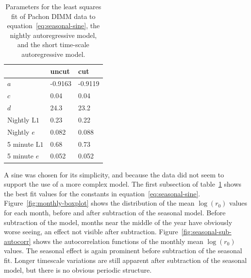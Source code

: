 \documentclass[DM,authoryear,toc]{lsstdoc}
\begin{document}
\begin{table}
\begin{center}
  \begin{tabular}{ l l l } \hline
      & uncut & cut \\ \hline
  $a$ & -0.9163 & -0.9119\\
  $c$ & 0.04 & 0.04 \\
  $d$ & 24.3 &  23.2 \\ \hline
  Nightly $\mbox{L1}$ & 0.23 & 0.22 \\
  Nightly $e$ & 0.082 & 0.088\\ \hline
  5 minute $\mbox{L1}$ & 0.68 & 0.73\\
  5 minute $e$ & 0.052 & 0.052\\ \hline
\end{tabular}
\caption{Parameters for the least squares fit of Pachon DIMM data to
  equation~\ref{eq:seasonal-sine}, the nightly autoregressive model,
  and the short time-scale autoregressive model.}\label{tab:fit-params}
\end{center}
\end{table}

A sine was chosen for its simplicity, and because the data did not
seem to support the use of a more complex
model. The first subsection of table~\ref{tab:fit-params} shows the best fit
values for the constants in equation~\ref{eq:seasonal-sine}. Figure~\ref{fig:monthly-boxplot} shows the distribution of the
mean $\log(r_0)$ values for each month, before and after subtraction
of the seasonal model. Before subtraction of the model, months near
the middle of the year have obviously worse seeing, an effect not
visible after subtraction. Figure~\ref{fig:seasonal-sub-autocorr}
shows the autocorrelation functions of the monthly mean $\log(r_0)$
values. The seasonal effect is again prominent before subtraction of
the seasonal fit. Longer timescale variations are still apparent after
subtraction of the seasonal model, but there is no obvious periodic
structure.
\end{document}
